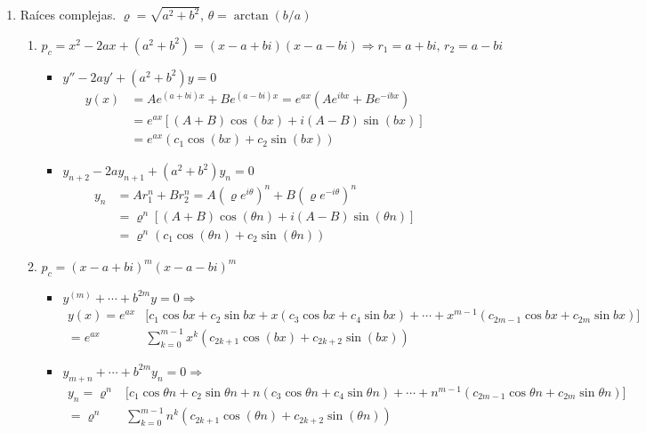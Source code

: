 \begin{enumerate}
    \item Raíces complejas. $\varrho = \sqrt{a^2+b^2}$, $\theta = \arctan(b/a) $
    \begin{enumerate}[noitemsep]
        \item $p_c = x^2 -2ax + (a^2 + b^2) = (x-a+bi)(x-a-bi) \Rightarrow r_1=a+bi, \, r_2 = a-bi$
        \begin{itemize}[noitemsep]
            \item $y'' - 2ay' + (a^2 + b^2)y = 0$ 
            \begin{align*}
                  y(x) & = A e^{(a+bi)x} + B e^{(a-bi)x} = e^{ax} \left( A e^{ibx} + B e^{-ibx} \right)  \\  & = e^{ax} \left[ (A+B)\cos(bx) + i(A-B)\sin(bx) \right]  \\  & = e^{ax}(c_1 \cos(bx) + c_2 \sin(bx))
            \end{align*}
            \item $y_{n+2} - 2ay_{n+1} + (a^2 + b^2)y_n = 0$
            \begin{align*}
                y_n & = A r_1^n + B r_2^n = A(\varrho e^{i\theta})^n + B(\varrho e^{-i\theta})^n  \\  & = \varrho^n \left[ (A+B)\cos(\theta n) + i(A-B)\sin(\theta n) \right]   \\  & = \varrho^n(c_1 \cos(\theta n) + c_2 \sin(\theta n))
            \end{align*}
        \end{itemize}
        \item $p_c = (x-a+bi)^m (x-a-bi)^m$
        \begin{itemize}[noitemsep]
            \item $y^{(m)} + \cdots + b^{2m} y = 0 \Rightarrow$ \begin{align*}
                y(x) = e^{a x}& \Big[ c_1 \cos b x + c_2 \sin b x +  x(c_3 \cos b x + c_4 \sin b x) + \cdots + x^{m-1}(c_{2m-1} \cos b x + c_{2m} \sin b x)\Big] \\ 
                 = e^{a x} &  \sum_{k=0}^{m-1} x^k \left( c_{2k+1} \cos(b x) + c_{2k+2} \sin(b x) \right) 
            \end{align*}
            \item $y_{m+n} + \cdots + b^{2m} y_n = 0 \Rightarrow$ \begin{align*}
               y_n = \varrho^n &  \Big[ c_1 \cos \theta n + c_2 \sin \theta n +  n(c_3 \cos \theta n + c_4 \sin \theta n) +  \cdots + n^{m-1}(c_{2m-1} \cos \theta n + c_{2m} \sin \theta n) \Big] \\ =  \varrho^n & \sum_{k=0}^{m-1} n^k \left( c_{2k+1} \cos(\theta n) + c_{2k+2} \sin(\theta n) \right)            
            \end{align*} 
        \end{itemize}
    \end{enumerate}
\end{enumerate}

